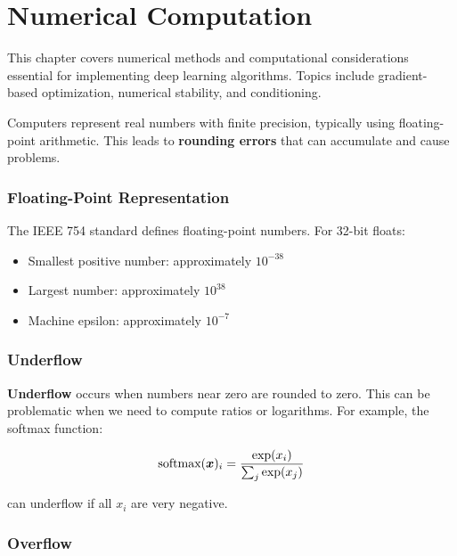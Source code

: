 
\chapter{Numerical Computation}
\label{chap:numerical-computation}

This chapter covers numerical methods and computational considerations essential for implementing deep learning algorithms. Topics include gradient-based optimization, numerical stability, and conditioning.





\label{sec:overflow-underflow}

Computers represent real numbers with finite precision, typically using floating-point arithmetic. This leads to \textbf{rounding errors} that can accumulate and cause problems.

\subsection{Floating-Point Representation}

The IEEE 754 standard defines floating-point numbers. For 32-bit floats:
\begin{itemize}
    \item Smallest positive number: approximately $10^{-38}$
    \item Largest number: approximately $10^{38}$
    \item Machine epsilon: approximately $10^{-7}$
\end{itemize}

\subsection{Underflow}

\textbf{Underflow} occurs when numbers near zero are rounded to zero. This can be problematic when we need to compute ratios or logarithms. For example, the softmax function:

\begin{equation}
\text{softmax}(\boldsymbol{x})_i = \frac{\exp(x_i)}{\sum_j \exp(x_j)}
\end{equation}

can underflow if all $x_i$ are very negative.

\subsection{Overflow}


